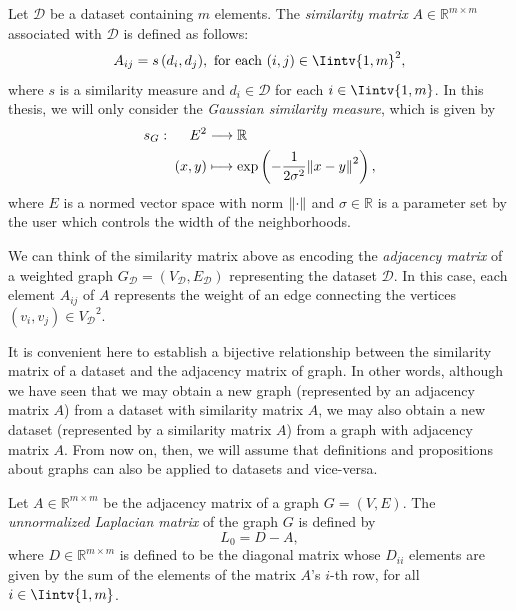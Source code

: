 \begin{definition}
   Let $\mathcal D$ be a dataset containing $m$ elements. The \textit{similarity matrix} $A \in \mathbb{R}^{m \times m}$ associated with $\mathcal D$ is defined as follows: 
   \begin{equation}
      A_{ij} = s\,(d_i,d_j), \text{ for each } (i,j) \in \Iintv{1,m}^2,
   \end{equation}
   where $s$ is a similarity measure and $d_i \in \mathcal D$ for each $i \in \Iintv{1,m}$.
   In this thesis, we will only consider the \textit{Gaussian similarity measure}, which is given by 
   \begin{equation}
      \begin{split}
         s_G:\,\,\,\,\,\,\,\,   E^2  &\longrightarrow \mathbb R  \\
          (x, y) & \longmapsto \exp \left( -\frac{1}{2 \sigma ^2} {\left\lVert x - y\right\rVert}^2 \right),
      \end{split}
   \end{equation}
   where $E$ is a normed vector space with norm $\left\lVert\cdot\right\rVert$ and $\sigma \in \mathbb R$ is a parameter set by the user which controls the width of the neighborhoods.
\end{definition}

We can think of the similarity matrix above as encoding the \textit{adjacency matrix} of a weighted graph $G_{\mathcal D} = (V_{\mathcal D}, E_{\mathcal D})$ representing the dataset $\mathcal D$. 
In this case, each element $A_{ij}$ of $A$ represents the weight of an edge connecting the vertices $(v_i, v_j) \in {V_{\mathcal D}}^2$.

\begin{remark}
It is convenient here to establish a bijective relationship between the similarity matrix of a dataset and the adjacency matrix of graph.
   In other words, although we have seen that we may obtain a new graph (represented by an adjacency matrix $A$) from a dataset with similarity matrix $A$, we may also obtain a new dataset (represented by a similarity matrix $A$) from a graph with adjacency matrix $A$.
   From now on, then, we will assume that definitions and propositions about graphs can also be applied to datasets and vice-versa.
\end{remark}

\begin{definition}
   Let $A \in \mathbb R ^{m \times m}$ be the adjacency matrix of a graph $G = (V, E)$. The \textit{unnormalized Laplacian matrix} of the graph $G$ is defined by
   \begin{equation}
      L_0 = D - A,
   \end{equation}
   where $D \in \mathbb R ^{m \times m}$ is defined to be the diagonal matrix whose $D_{ii}$ elements are given by the sum of the elements of the matrix $A$'s $i$-th row, for all $i \in \Iintv{1,m}$.
\end{definition}


